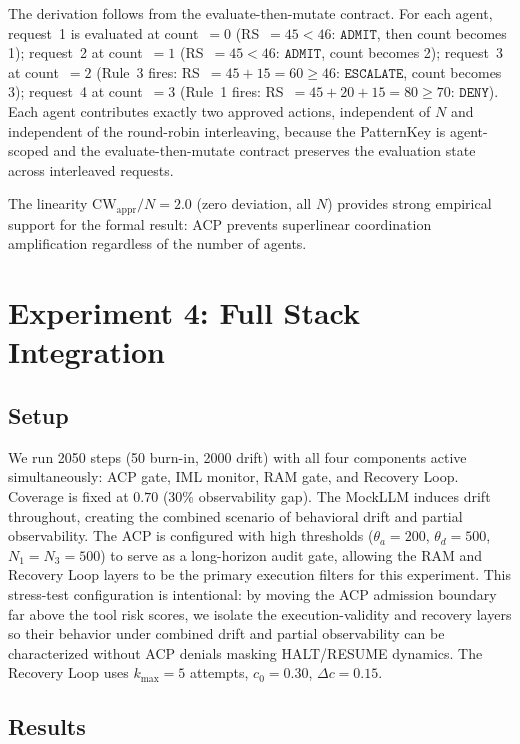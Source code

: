\documentclass[11pt]{article}
\newcommand{\CW}{\mathrm{CW}}
\newcommand{\ADMIT}{\texttt{ADMIT}}
\newcommand{\ESCALATE}{\texttt{ESCALATE}}
\newcommand{\DENY}{\texttt{DENY}}
\begin{document}
The derivation follows from the evaluate-then-mutate contract.
For each agent, request~1 is evaluated at count~$=0$ (RS~$=45 < 46$:
$\ADMIT$, then count becomes 1); request~2 at count~$=1$
(RS~$=45 < 46$: $\ADMIT$, count becomes 2); request~3 at count~$=2$
(Rule~3 fires: RS~$=45+15=60 \geq 46$: $\ESCALATE$, count becomes 3);
request~4 at count~$=3$ (Rule~1 fires: RS~$=45+20+15=80 \geq 70$:
$\DENY$).
Each agent contributes exactly two approved actions, independent of $N$
and independent of the round-robin interleaving, because the PatternKey
is agent-scoped and the evaluate-then-mutate contract preserves
the evaluation state across interleaved requests.

The linearity $\CW_{\mathrm{appr}}/N = 2.0$ (zero deviation, all $N$)
provides strong empirical support for the formal result: ACP prevents
superlinear coordination amplification regardless of the number of agents.

\section{Experiment 4: Full Stack Integration}
\label{sec:exp4}

\subsection{Setup}

We run 2050 steps (50 burn-in, 2000 drift) with all four components active
simultaneously: ACP gate, IML monitor, RAM gate, and Recovery Loop.
Coverage is fixed at $0.70$ (30\% observability gap).
The MockLLM induces drift throughout, creating the combined scenario of
behavioral drift and partial observability.
The ACP is configured with high thresholds ($\theta_a = 200$,
$\theta_d = 500$, $N_1 = N_3 = 500$) to serve as a long-horizon
audit gate, allowing the RAM and Recovery Loop layers to be the primary
execution filters for this experiment.
This stress-test configuration is intentional: by moving the ACP admission
boundary far above the tool risk scores, we isolate the execution-validity
and recovery layers so their behavior under combined drift and partial
observability can be characterized without ACP denials masking HALT/RESUME dynamics.
The Recovery Loop uses $k_{\max} = 5$ attempts, $c_0 = 0.30$,
$\Delta c = 0.15$.

\subsection{Results}
\end{document}
